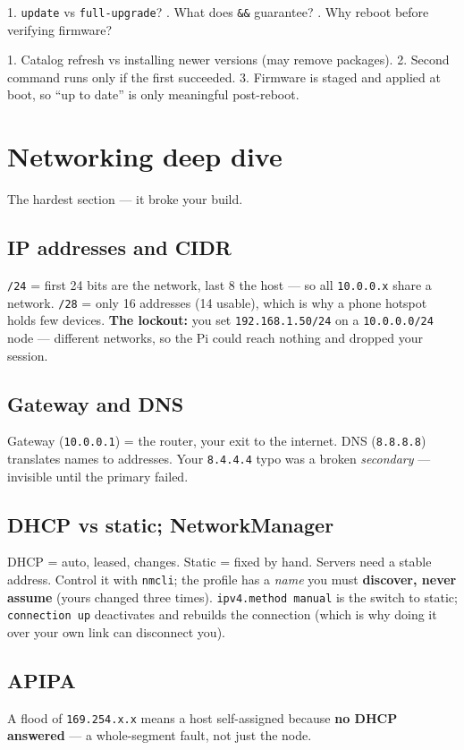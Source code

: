 \documentclass[11pt,a4paper]{article}
\begin{document}
\begin{skillq}
1. \texttt{update} vs \texttt{full-upgrade}? . What does \texttt{\&\&} guarantee? . Why reboot before verifying firmware?
\end{skillq}
\begin{skilla}
1. Catalog refresh vs installing newer versions (may remove packages). 2. Second command runs only if the first succeeded. 3. Firmware is staged and applied at boot, so ``up to date'' is only meaningful post-reboot.
\end{skilla}

\section{Networking deep dive}
The hardest section — it broke your build.
\subsection{IP addresses and CIDR}
\texttt{/24} = first 24 bits are the network, last 8 the host — so all
\texttt{10.0.0.x} share a network. \texttt{/28} = only 16 addresses (14 usable),
which is why a phone hotspot holds few devices. \textbf{The lockout:} you set
\texttt{192.168.1.50/24} on a \texttt{10.0.0.0/24} node — different networks, so
the Pi could reach nothing and dropped your session.
\subsection{Gateway and DNS}
Gateway (\texttt{10.0.0.1}) = the router, your exit to the internet. DNS
(\texttt{8.8.8.8}) translates names to addresses. Your \texttt{8.4.4.4} typo was
a broken \emph{secondary} — invisible until the primary failed.
\subsection{DHCP vs static; NetworkManager}
DHCP = auto, leased, changes. Static = fixed by hand. Servers need a stable
address. Control it with \texttt{nmcli}; the profile has a \emph{name} you must
\textbf{discover, never assume} (yours changed three times). \texttt{ipv4.method
manual} is the switch to static; \texttt{connection up} deactivates and
rebuilds the connection (which is why doing it over your own link can
disconnect you).
\subsection{APIPA}
A flood of \texttt{169.254.x.x} means a host self-assigned because \textbf{no
DHCP answered} — a whole-segment fault, not just the node.
\end{document}
